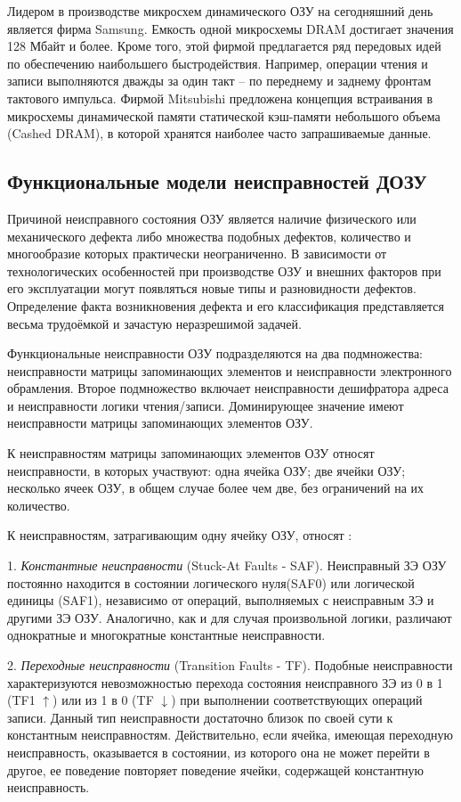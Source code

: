Лидером в производстве микросхем динамического ОЗУ на сегодняшний день является фирма Samsung. Емкость одной микросхемы DRAM достигает значения 128 Мбайт и более. Кроме того, этой фирмой предлагается ряд передовых идей по обеспечению наибольшего быстродействия. Например, операции чтения и записи выполняются дважды за один такт – по переднему и заднему фронтам тактового импульса. Фирмой Mitsubishi предложена концепция встраивания в микросхемы динамической памяти статической кэш-памяти небольшого объема (Cashed DRAM), в которой хранятся наиболее часто запрашиваемые данные.

\subsection{Функциональные модели неисправностей ДОЗУ}
\label{sub:domain:faults}
Причиной неисправного состояния ОЗУ является наличие физического или механического дефекта либо множества подобных дефектов, количество и многообразие которых практически неограниченно. В зависимости от технологических особенностей при производстве ОЗУ и внешних факторов при его эксплуатации могут появляться новые типы и разновидности дефектов. Определение факта возникновения дефекта и его классификация представляется весьма трудоёмкой и зачастую неразрешимой задачей. 

Функциональные неисправности ОЗУ подразделяются на два подмножества: неисправности матрицы запоминающих элементов и неисправности электронного обрамления. Второе подмножество включает неисправности дешифратора адреса и неисправности логики чтения/записи. Доминирующее значение имеют неисправности матрицы запоминающих элементов ОЗУ.

К неисправностям матрицы запоминающих элементов ОЗУ относят неисправности, в которых участвуют: одна ячейка ОЗУ; две ячейки ОЗУ; несколько ячеек ОЗУ, в общем случае более чем две, без ограничений на их количество. 

К неисправностям, затрагивающим одну ячейку ОЗУ, относят \cite{faults}:

1. \textit{Константные неисправности} (Stuck-At Faults - SAF). Неисправный ЗЭ ОЗУ постоянно находится в состоянии логического нуля(SAF0) или логической единицы (SAF1), независимо от операций, выполняемых с неисправным ЗЭ и другими ЗЭ ОЗУ. Аналогично, как и для случая произвольной логики, различают однократные и многократные константные неисправности.

2. \textit{Переходные неисправности} (Transition Faults - TF). Подобные неисправности характеризуются невозможностью перехода состояния неисправного ЗЭ из 0 в 1 (TF1 $\uparrow$) или из 1 в 0 (TF $\downarrow$) при выполнении соответствующих операций записи. Данный тип неисправности достаточно близок по своей сути к константным неисправностям. Действительно, если ячейка, имеющая переходную неисправность, оказывается в состоянии, из которого она не может перейти в другое, ее поведение повторяет поведение ячейки, содержащей константную неисправность.


